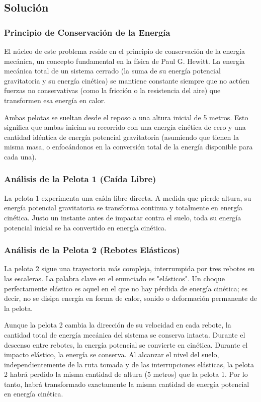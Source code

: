 \documentclass[12pt, a4paper]{article}
\begin{document}
\subsection*{Solución}

\subsubsection*{Principio de Conservación de la Energía}

El núcleo de este problema reside en el principio de conservación de la energía mecánica, un concepto fundamental en la física de Paul G. Hewitt. La energía mecánica total de un sistema cerrado (la suma de su energía potencial gravitatoria y su energía cinética) se mantiene constante siempre que no actúen fuerzas no conservativas (como la fricción o la resistencia del aire) que transformen esa energía en calor.

Ambas pelotas se sueltan desde el reposo a una altura inicial de 5 metros. Esto significa que ambas inician su recorrido con una energía cinética de cero y una cantidad idéntica de energía potencial gravitatoria (asumiendo que tienen la misma masa, o enfocándonos en la conversión total de la energía disponible para cada una).

\subsubsection*{Análisis de la Pelota 1 (Caída Libre)}

La pelota 1 experimenta una caída libre directa. A medida que pierde altura, su energía potencial gravitatoria se transforma continua y totalmente en energía cinética. Justo un instante antes de impactar contra el suelo, toda su energía potencial inicial se ha convertido en energía cinética.

\subsubsection*{Análisis de la Pelota 2 (Rebotes Elásticos)}

La pelota 2 sigue una trayectoria más compleja, interrumpida por tres rebotes en las escaleras. La palabra clave en el enunciado es "elásticos". Un choque perfectamente elástico es aquel en el que no hay pérdida de energía cinética; es decir, no se disipa energía en forma de calor, sonido o deformación permanente de la pelota. 

Aunque la pelota 2 cambia la dirección de su velocidad en cada rebote, la cantidad total de energía mecánica del sistema se conserva intacta. Durante el descenso entre rebotes, la energía potencial se convierte en cinética. Durante el impacto elástico, la energía se conserva. Al alcanzar el nivel del suelo, independientemente de la ruta tomada y de las interrupciones elásticas, la pelota 2 habrá perdido la misma cantidad de altura (5 metros) que la pelota 1. Por lo tanto, habrá transformado exactamente la misma cantidad de energía potencial en energía cinética.
\end{document}
